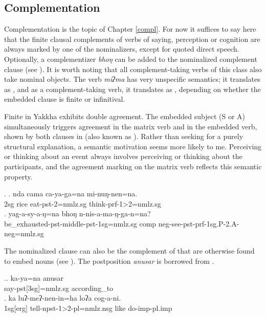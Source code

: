 \subsection{Complementation}\label{nmlz-uni-2}

Complementation is the topic of Chapter \ref{compl}. For now it suffices to say here that the finite clausal complements of verbs of saying, perception or cognition are always marked by one of the nominalizers, except for quoted direct speech. Optionally, a complementizer \emph{bhoŋ}  can be added to the nominalized complement clause (see \Next[b]). It is worth noting that all complement-taking verbs of this class also take nominal objects. The verb \emph{miʔma} has very unspecific semantics; it translates as , and as a complement-taking verb, it translates as , depending on whether the embedded clause is finite or infinitival. 

Finite  in Yakkha exhibits double agreement. The embedded subject (S or A) simultaneously triggers agreement in the matrix verb and in the embedded verb, shown by both clauses in \Next (also known as ). Rather than seeking for a purely structural explanation, a semantic motivation seems more likely to me. Perceiving or thinking about an event always involves perceiving or thinking about the participants, and the agreement marking on the matrix verb reflects this semantic property.


\ex. \ag. nda cama ca-ya-ga=na mi-nuŋ-nen=na.\\
{\sc 2sg} rice eat-{\sc pst-2=nmlz.sg} think-{\sc prf-1>2=nmlz.sg}\\
\bg. yag-a-sy-a-ŋ=na bhoŋ n-nis-a-ma-ŋ-ga-n=na?\\
be\_exhausted{\sc -pst-middle-pst-1sg=nmlz.sg} comp {\sc neg}-see-{\sc pst-prf-1sg.P-2.A-neg=nmlz.sg}\\

		
The nominalized clause can also be the complement of  that are otherwise found to embed nouns (see \Next). The postposition \emph{anusar} is borrowed from .

\ex.\ag. ka-ya=na anusar\\
	say{\sc -pst[3sg]=nmlz.sg} according\_to\\
\bg. ka       luʔ-meʔ-nen-in=ha      loʔa cog-a-ni.\\
{\sc 1sg[erg]} tell{\sc -npst-1>2-pl=nmlz.nsg} like  do{\sc -imp-pl.imp}\\


